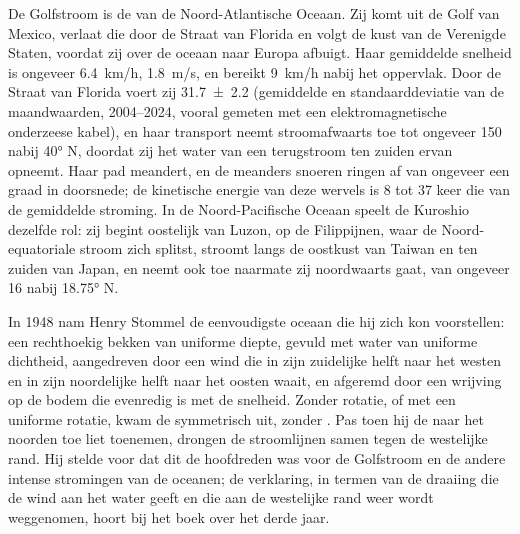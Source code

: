De Golfstroom is de  van de Noord-Atlantische Oceaan. Zij komt uit de Golf van Mexico, verlaat die door de Straat van Florida en volgt de kust van de Verenigde Staten, voordat zij over de oceaan naar Europa afbuigt. Haar gemiddelde snelheid is ongeveer \qty{6.4}{km/h}, \qty{1.8}{m/s}, en bereikt \qty{9}{km/h} nabij het oppervlak. Door de Straat van Florida voert zij \qty[uncertainty-mode=separate]{31.7 \pm 2.2}{\sverdrup} (gemiddelde en standaarddeviatie van de maandwaarden, 2004--2024, vooral gemeten met een elektromagnetische onderzeese kabel), en haar transport neemt stroomafwaarts toe tot ongeveer \qty{150}{\sverdrup} nabij \ang{40} N, doordat zij het water van een terugstroom ten zuiden ervan opneemt. Haar pad meandert, en de meanders snoeren ringen af van ongeveer een graad in doorsnede; de kinetische energie van deze wervels is \num{8} tot \num{37} keer die van de gemiddelde stroming. In de Noord-Pacifische Oceaan speelt de Kuroshio dezelfde rol: zij begint oostelijk van Luzon, op de Filippijnen, waar de Noord-equatoriale stroom zich splitst, stroomt langs de oostkust van Taiwan en ten zuiden van Japan, en neemt ook toe naarmate zij noordwaarts gaat, van ongeveer \qty{16}{\sverdrup} nabij \ang{18.75} N.

\begin{history}[Stommel 1948]
In 1948 nam Henry Stommel de eenvoudigste oceaan die hij zich kon voorstellen: een rechthoekig bekken van uniforme diepte, gevuld met water van uniforme dichtheid, aangedreven door een wind die in zijn zuidelijke helft naar het westen en in zijn noordelijke helft naar het oosten waait, en afgeremd door een wrijving op de bodem die evenredig is met de snelheid. Zonder rotatie, of met een uniforme rotatie, kwam de  symmetrisch uit, zonder . Pas toen hij de  naar het noorden toe liet toenemen, drongen de stroomlijnen samen tegen de westelijke rand. Hij stelde voor dat dit de hoofdreden was voor de Golfstroom en de andere intense stromingen van de oceanen; de verklaring, in termen van de draaiing die de wind aan het water geeft en die aan de westelijke rand weer wordt weggenomen, hoort bij het boek over het derde jaar.
\end{history}

